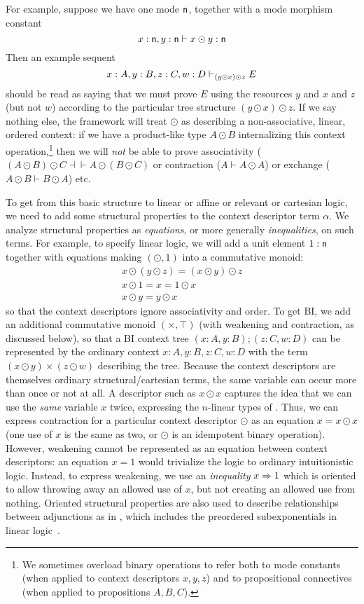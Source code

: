 For example, suppose we have one mode $\mathsf{n}$, together with a mode
morphism constant
\[
x : \mathsf{n}, y:\mathsf{n} \vdash x \odot y : \mathsf{n}
\]
Then an example sequent
\[
x:A, y:B, z:C, w:D \vdash_{(y \odot x) \odot z} E
\]
should be read as saying that we must prove $E$ using the resources $y$
and $x$ and $z$ (but not $w$) according to the particular tree structure
${(y \odot x) \odot z}$.  If we say nothing else, the framework will
treat $\odot$ as describing a non-associative, linear, ordered context:
if we have a product-like type $A \odot B$ internalizing this context
operation,\footnote{We sometimes overload binary operations to refer
  both to mode constants (when applied to context descriptors $x,y,z$)
  and to propositional connectives (when applied to propositions
  $A,B,C$).} then we will \emph{not} be able to prove associativity ($(A
\odot B) \odot C \dashv\vdash A \odot (B \odot C)$ or contraction ($A
\vdash A \odot A$) or exchange ($A \odot B \vdash B \odot A$) etc.

To get from this basic structure to linear or affine or relevant or
cartesian logic, we need to add some structural properties to the
context descriptor term $\alpha$.  We analyze structural properties as
\emph{equations}, or more generally \emph{inequalities}, on such terms.
For example, to specify linear logic, we will add a unit element $1 :
\mathsf{n}$ together with equations making $(\odot,1)$ into a commutative
monoid:
\[
\begin{array}{c}
x \odot (y \odot z) = (x \odot y) \odot z\\
x \odot 1 = x = 1 \odot x\\
x \odot y = y \odot x
\end{array}
\]
so that the context descriptors ignore associativity and order.  To get
BI, we add an additional commutative monoid $(\times,\top)$ (with
weakening and contraction, as discussed below), so that a BI context
tree $(x:A,y:B);(z:C,w:D)$ can be represented by the ordinary context
$x:A,y:B,z:C,w:D$ with the term $(x \odot y) \times (z \odot w)$
describing the tree.  Because the context descriptors are themselves
ordinary structural/cartesian terms, the same variable can occur more
than once or not at all.  A descriptor such as $x \odot x$ captures the
idea that we can use the \emph{same} variable $x$ twice, expressing the
$n$-linear types of \citet{reed}.  Thus, we can express contraction for
a particular context descriptor $\odot$ as an equation $x = x \odot x$
(one use of $x$ is the same as two, or $\odot$ is an idempotent binary
operation).  However, weakening cannot be represented as an equation
between context descriptors: an equation $x = 1$ would trivialize the
logic to ordinary intuitionistic logic.  Instead, to express weakening,
we use an \emph{inequality} $x \Rightarrow 1$ which is oriented to allow
throwing away an allowed use of $x$, but not creating an allowed use
from nothing.  Oriented structural properties are also used to describe
relationships between adjunctions as in \citep{ls16adjoint}, which
includes the preordered subexponentials in linear
logic~\citep{damos,nigman}.

